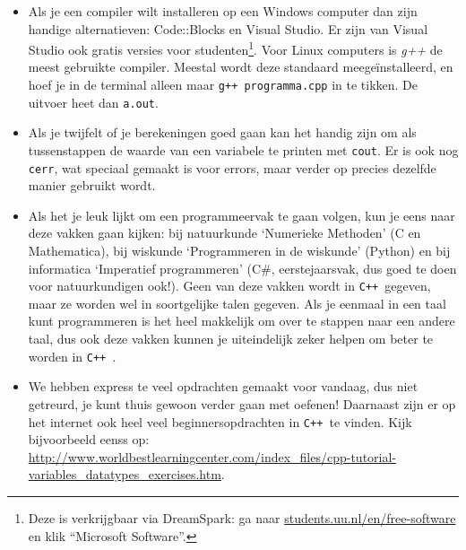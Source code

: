 \documentclass[12pt,a4paper]{article}
\newcommand{\icode}{\lstinline}
\newcommand{\mono}{\texttt}
\newcommand{\cpp}{\mono{C++ }}
\begin{document}
\begin{itemize}
\begin{enumerate}
	\end{enumerate}
	\item Als je een compiler wilt installeren op een Windows computer dan zijn handige alternatieven: Code::Blocks en Visual Studio. Er zijn van Visual Studio ook gratis versies voor studenten\footnote{Deze is verkrijgbaar via DreamSpark: ga naar \url{students.uu.nl/en/free-software} en klik ``Microsoft Software''.}.
		Voor Linux computers is \emph{g++} de meest gebruikte compiler. Meestal wordt deze standaard meegeïnstalleerd, en hoef je in de terminal alleen maar \mono{g++ programma.cpp} in te tikken. De uitvoer heet dan \mono{a.out}.
	\item Als je twijfelt of je berekeningen goed gaan kan het handig zijn om als tussenstappen de waarde van een variabele te printen met \icode{cout}. Er is ook nog \icode{cerr}, wat speciaal gemaakt is voor errors, maar verder op precies dezelfde manier gebruikt wordt.
	\item Als het je leuk lijkt om een programmeervak te gaan volgen, kun je eens naar deze vakken gaan kijken: bij natuurkunde `Numerieke Methoden' (C en Mathematica), bij wiskunde `Programmeren in de wiskunde' (Python) en bij informatica `Imperatief programmeren' (C\#, eerstejaarsvak, dus goed te doen voor natuurkundigen ook!). Geen van deze vakken wordt in \cpp gegeven, maar ze worden wel in soortgelijke talen gegeven. Als je eenmaal in een taal kunt programmeren is het heel makkelijk om over te stappen naar een andere taal, dus ook deze vakken kunnen je uiteindelijk zeker helpen om beter te worden in \cpp. 
	\item We hebben express te veel opdrachten gemaakt voor vandaag, dus niet getreurd, je kunt thuis gewoon verder gaan met oefenen! Daarnaast zijn er op het internet ook heel veel beginnersopdrachten in \cpp te vinden. Kijk bijvoorbeeld eenss op: \url{http://www.worldbestlearningcenter.com/index_files/cpp-tutorial-variables_datatypes_exercises.htm}.
\end{itemize}
\end{document}
